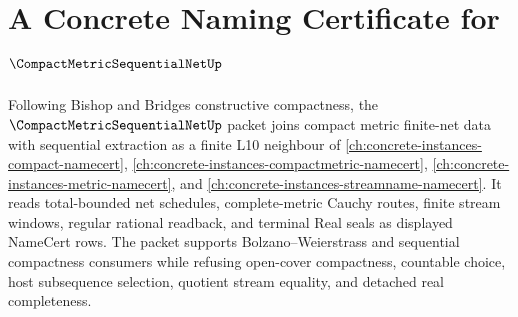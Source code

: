 \chapter{A Concrete Naming Certificate for $\CompactMetricSequentialNetUp$}
\label{ch:concrete-instances-compact-metric-sequential-net-namecert}

Following Bishop and Bridges constructive compactness, the $\CompactMetricSequentialNetUp$ packet joins compact metric finite-net data with sequential extraction as a finite L10 neighbour of \autoref{ch:concrete-instances-compact-namecert}, \autoref{ch:concrete-instances-compactmetric-namecert}, \autoref{ch:concrete-instances-metric-namecert}, and \autoref{ch:concrete-instances-streamname-namecert}. It reads total-bounded net schedules, complete-metric Cauchy routes, finite stream windows, regular rational readback, and terminal Real seals as displayed NameCert rows. The packet supports Bolzano--Weierstrass and sequential compactness consumers while refusing open-cover compactness, countable choice, host subsequence selection, quotient stream equality, and detached real completeness.

